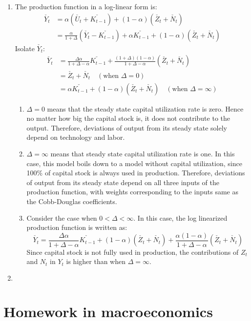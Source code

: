 \documentclass[11pt]{amsart}
\begin{document}
\begin{enumerate}[label=(\alph*)]
	\item The production function in a log-linear form is: 
	\begin{align*}
	\check{Y_t} &= \alpha \left( \check{U_t} + \check{K_{t-1}} \right) + (1-\alpha) \left(  \check{Z_t} + \check{N_t}\right) \\
	& = \frac{\alpha}{1 + \Delta} \left( \check{Y_t} - \check{K_{t-1}} \right) + \alpha \check{K_{t-1}} + (1-\alpha ) \left(  \check{Z_t} + \check{N_t}\right)
	\end{align*} 
	Isolate $\check{Y_t}$:
	\begin{align*}
	\check{Y_t} &= \frac{\Delta \alpha }{1 + \Delta - \alpha} \check{K_{t-1}} + \frac{(1+\Delta)(1-\alpha)}{1+ \Delta - \alpha} \left(  \check{Z_t} + \check{N_t} \right)  \\
	& = \check{Z_t} + \check{N_t} \quad \left( \text{when } \Delta = 0 \right) \\
	& = \alpha \check{K_{t-1}} + (1-\alpha) \left( \check{Z_t } + \check{N_t} \right)   \quad \left( \text{when } \Delta = \infty \right)
	\end{align*}
	\begin{enumerate}[label = (\roman*)]
    \item $\Delta = 0 $ means that the steady state capital utilization rate is zero. Hence no matter how big the capital stock is, it does not contribute to the output. Therefore, deviations of output from its steady state solely depend on technology and labor. 
    
    \item $\Delta = \infty$ means that steady state capital utilization rate is one. In this case, this model boils down to a model without capital utilization, since 100\% of capital stock is always used in production. Therefore, deviations of output from its steady state depend on all three inputs of the production function, with weights corresponding to the inputs same as the Cobb-Douglas coefficients. 
    
    \item Consider the case when $0 < \Delta < \infty$. In this case, the log linearized production function is written as: 
    \begin{equation*}
    \check{Y_t} = \frac{\Delta \alpha }{1 + \Delta - \alpha} \check{K_{t-1}} + (1-\alpha) \left( \check{Z_t} + \check{N_t} \right)+ \frac{\alpha (1-\alpha)}{1+ \Delta - \alpha} \left(  \check{Z_t} + \check{N_t} \right)
    \end{equation*}
    Since capital stock is not fully used in production, the contributions of $Z_t$ and $N_t$ in $Y_t$ is higher than when $\Delta = \infty$. 
    \end{enumerate}
    \item 
\end{enumerate}

\section{Homework in macroeconomics}
\end{document}

